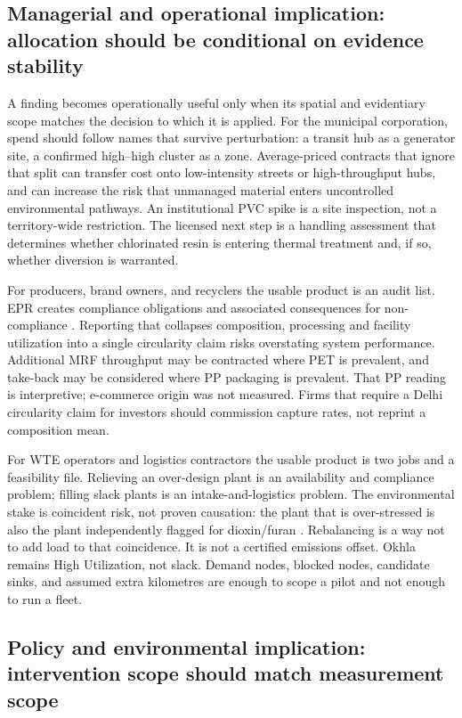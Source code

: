 \documentclass[12pt,a4paper]{article}
\begin{document}
\subsection{Managerial and operational implication: allocation should be conditional on evidence stability}

A finding becomes operationally useful only when its spatial and evidentiary scope matches the decision to which it is applied. For the municipal corporation, spend should follow names that survive perturbation: a transit hub as a generator site, a confirmed high--high cluster as a zone. Average-priced contracts that ignore that split can transfer cost onto low-intensity streets or high-throughput hubs, and can increase the risk that unmanaged material enters uncontrolled environmental pathways. An institutional PVC spike is a site inspection, not a territory-wide restriction. The licensed next step is a handling assessment that determines whether chlorinated resin is entering thermal treatment and, if so, whether diversion is warranted.

For producers, brand owners, and recyclers the usable product is an audit list. EPR creates compliance obligations and associated consequences for non-compliance \citep{cpcb_pwm_amendment_2026,pib_plastic_waste_2025}. Reporting that collapses composition, processing and facility utilization into a single circularity claim risks overstating system performance. Additional MRF throughput may be contracted where PET is prevalent, and take-back may be considered where PP packaging is prevalent. That PP reading is interpretive; e-commerce origin was not measured. Firms that require a Delhi circularity claim for investors should commission capture rates, not reprint a composition mean.

For WTE operators and logistics contractors the usable product is two jobs and a feasibility file. Relieving an over-design plant is an availability and compliance problem; filling slack plants is an intake-and-logistics problem. The environmental stake is coincident risk, not proven causation: the plant that is over-stressed is also the plant independently flagged for dioxin/furan \citep{ht_cpcb_affidavit_2026}. Rebalancing is a way not to add load to that coincidence. It is not a certified emissions offset. Okhla remains High Utilization, not slack. Demand nodes, blocked nodes, candidate sinks, and assumed extra kilometres are enough to scope a pilot and not enough to run a fleet.

\subsection{Policy and environmental implication: intervention scope should match measurement scope}
\end{document}
